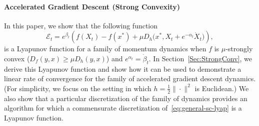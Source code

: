 \documentclass[11pt]{article}
\theoremstyle{plain}
\newcommand{\E}{{\mathcal E}}
\begin{document}
\paragraph{Accelerated Gradient Descent (Strong Convexity)}
In this paper, we show that the following function 
   \begin{equation}\label{eq:general-sc-lyap}
  \E_t =  e^{\beta_t} \left(f(X_t) - f(x^\ast) + \mu D_h\Big(x^\ast ,X_t + e^{-\alpha_t} \dot X_t\Big)\right),
 \end{equation}
is a Lyapunov function for a family of momentum dynamics when $f$ is $\mu$-strongly convex ($D_f(y,x) \geq \mu D_h(y,x)$) and $e^{\alpha_t} = \dot \beta_t$.  In Section~\ref{Sec:StrongConv}, we derive this Lyapunov function and show how it can be used to demonstrate a linear rate of convergence for the family of accelerated gradient descent dynamics.  (For simplicity, we focus on the setting in which $h = \frac{1}{2}\|\cdot\|^2$ is Euclidean.) We also show that a particular discretization of the family of dynamics provides an algorithm for which a commensurate discretization of~\eqref{eq:general-sc-lyap} is a Lyapunov function.

\end{document}
